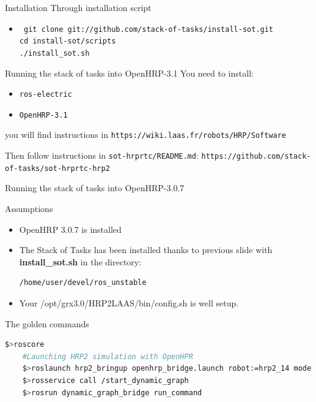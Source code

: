 %
%

\begin{frame} {Installation}
  Through installation script
  \begin{itemize}
  \item \texttt{\tiny
    git clone git://github.com/stack-of-tasks/install-sot.git\\
    cd install-sot/scripts\\
    ./install\_sot.sh
  }
  \end{itemize}
\end{frame}

%
%

\begin{frame} {Running the stack of tasks into OpenHRP-3.1}
  You need to install:
  \begin{itemize}
    \item \texttt{ros-electric}
    \item \texttt{OpenHRP-3.1}
  \end{itemize}
  you will find instructions in \texttt{\tiny https://wiki.laas.fr/robots/HRP/Software}

  Then follow instructions in \texttt{\tiny sot-hrprtc/README.md}: \texttt{https://github.com/stack-of-tasks/sot-hrprtc-hrp2}
\end{frame}

%
%

\begin{frame}[fragile]{Running the stack of tasks into OpenHRP-3.0.7}
  \begin{block}{Assumptions}
    \begin{itemize}
      \item OpenHRP 3.0.7 is installed
      \item The Stack of Tasks has been installed thanks to previous slide with
        \textbf{install\_sot.sh} in the directory:
        \begin{lstlisting}[language=bash,basicstyle=\small,frame=single,showlines=false]    
          /home/user/devel/ros_unstable
        \end{lstlisting}
      \item Your /opt/grx3.0/HRP2LAAS/bin/config.sh is well setup.
    \end{itemize}
  \end{block}
  \begin{block}{The golden commands}
  \begin{lstlisting}[language=bash,basicstyle=\tiny,backgroundcolor=\color{AliceBlue}, frame=single,showlines=false]
    $>roscore
    #Launching HRP2 simulation with OpenHPR
    $>roslaunch hrp2_bringup openhrp_bridge.launch robot:=hrp2_14 mode:=dg_with_stabilizer simulation:=true
    $>rosservice call /start_dynamic_graph 
    $>rosrun dynamic_graph_bridge run_command
  \end{lstlisting}
  \end{block}
\end{frame}

